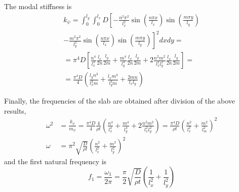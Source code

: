 \documentclass{article}
\begin{document}
The modal stiffness is
\begin{multline*}
k_\psi =
\int_0^{l_y}\int_0^{l_x}D \left[-\frac{n^2\pi^2}{l_x^2} \sin\left(\frac{n\pi x}{l_x}\right) \sin\left(\frac{m\pi y}{l_y}\right)\right.\\
\left.-\frac{m^2\pi^2}{l_y^2} \sin\left(\frac{n\pi x}{l_x}\right) \sin\left(\frac{m\pi y}{l_y}\right) \right]^2 dxdy = \\
= \pi^4D \left[ \frac{n^4}{l_x^4}\frac{l_x}{2n}\frac{l_y}{2m} + \frac{m^4}{l_y^4}\frac{l_x}{2n}\frac{l_y}{2m}
+ 2\frac{n^2m^2}{l_x^2l_y^2}\frac{l_x}{2n}\frac{l_y}{2m} \right] = \\
= \frac{\pi^4D}{4}\left(\frac{l_yn^3}{l_x^3m} + \frac{l_xm^3}{l_y^3m} + \frac{2mn}{l_xl_y}\right)
\end{multline*}

Finally, the frequencies of the slab are obtained after division of the above results,
\begin{align*}
\omega^2 &= \frac{k_\psi}{m_\psi} = \frac{\pi^4D}{4}\frac{4}{\rho t}
\left(\frac{n^4}{l_x^4} + \frac{m^4}{l_y^4} + 2\frac{n^2m^2}{l_x^2l_y^2}\right)
= \frac{\pi^4D}{\rho t}\left(\frac{n^2}{l_x^2} + \frac{m^2}{l_m^2}\right)^2 \\
\omega &= \pi^2\sqrt{\frac{D}{\rho t}} \left(\frac{n^2}{l_x^2} + \frac{m^2}{l_y^2}\right)^2
\end{align*}
and the first natural frequency is
\begin{equation*}
f_1 = \frac{\omega_1}{2\pi} = \frac{\pi}{2}\sqrt{\frac{D}{\rho t}} \left(\frac{1}{l_x^2} + \frac{1}{l_y^2}\right)
\end{equation*}

\end{document}
